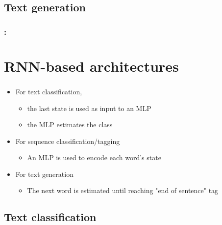 \documentclass[xcolor=table]{beamer}
\begin{document}
\subsection{Text generation}

\begin{frame}
	\frametitle{\insertshortsubtitle: \insertsection}
	\framesubtitle{\insertsubsection}
	
	
\end{frame}


\section{RNN-based architectures}

\begin{frame}
	\frametitle{\insertshortsubtitle}
	\framesubtitle{\insertsection}
	
	\begin{itemize}
		\item For text classification, 
		\begin{itemize}
			\item the last state is used as input to an MLP
			\item the MLP estimates the class
		\end{itemize}
		\item For sequence classification/tagging
		\begin{itemize}
			\item An MLP is used to encode each word's state
		\end{itemize}
		\item For text generation
		\begin{itemize}
			\item The next word is estimated until reaching "end of sentence" tag
		\end{itemize}
	\end{itemize}
	
\end{frame}

\subsection{Text classification}
\end{document}

